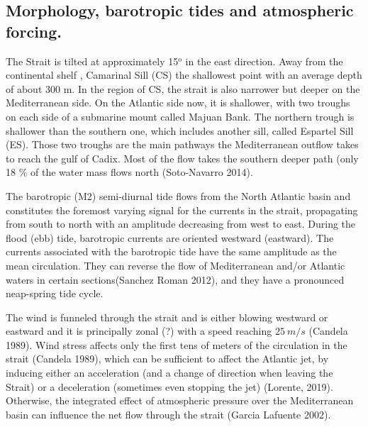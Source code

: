 \color{blue}\subsection{Morphology, barotropic tides and atmospheric forcing.} \color{black}


The Strait is \color{blue} tilted at approximately \color{black} 15$^\text{o}$ in the east direction. Away from \color{blue}the continental shelf \color{black}, Camarinal Sill (CS) the shallowest point with \color{blue}an average depth of about 300 m. In the region of CS, the strait is also narrower but deeper on the Mediterranean side. \color{black} On the Atlantic side now, it is shallower, with two troughs on each side of a submarine mount called Majuan Bank. The northern trough is shallower than the southern one, which includes another sill, called Espartel Sill (ES). Those two troughs are the main pathways the \color{blue}Mediterranean outflow takes \color{black} to \color{blue} reach \color{black} the gulf of Cadix. Most of the flow takes the southern deeper path \color{blue}(only 18 \% of the water mass flows north (Soto-Navarro 2014)\color{black}.

The barotropic (M2) semi-diurnal tide \color{blue} flows \color{black} from the North Atlantic \color{blue}basin and constitutes \color{black} the foremost varying signal for the currents in the strait, propagating from south to north with an amplitude decreasing from west to east\citep{candela_1990}. During the flood (ebb) tide, barotropic currents are oriented westward (eastward). The currents associated with the barotropic tide \color{blue} have the \color{black} same amplitude as the mean circulation\color{blue}. They \color{black} can reverse the flow of Mediterranean and/or Atlantic waters in certain sections(Sanchez Roman 2012), and they have a pronounced neap-spring tide cycle.

The wind is funneled through the strait and is either \color{blue}blowing westward or eastward and it is \color{black} principally zonal (?) with a speed \color{blue}reaching \color{black} $25\ m/s$ (Candela 1989). Wind stress affects only the first tens of meters of the circulation in the strait (Candela 1989), which can be sufficient to affect the Atlantic jet, by \color{blue}inducing either an acceleration (and a change of direction when leaving the Strait) or a deceleration (sometimes even stopping the jet) \color{black}(Lorente, 2019). Otherwise, the integrated effect of atmospheric pressure over the Mediterranean basin \color{blue} can \color{black} influence the net flow through the strait (Garcia Lafuente 2002).



